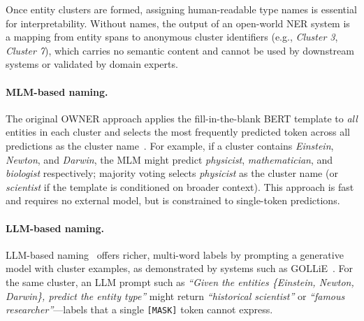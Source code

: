 \documentclass[14pt]{extreport}
\begin{document}
Once entity clusters are formed, assigning human-readable type names is essential for interpretability. Without names, the output of an open-world NER system is a mapping from entity spans to anonymous cluster identifiers (e.g., \textit{Cluster 3}, \textit{Cluster 7}), which carries no semantic content and cannot be used by downstream systems or validated by domain experts.

\paragraph{MLM-based naming.}
The original OWNER approach applies the fill-in-the-blank BERT template to \emph{all} entities in each cluster and selects the most frequently predicted token across all predictions as the cluster name~\cite{wang-etal-2023-crossner}. For example, if a cluster contains \textit{Einstein}, \textit{Newton}, and \textit{Darwin}, the MLM might predict \textit{physicist}, \textit{mathematician}, and \textit{biologist} respectively; majority voting selects \textit{physicist} as the cluster name (or \textit{scientist} if the template is conditioned on broader context). This approach is fast and requires no external model, but is constrained to single-token predictions.

\paragraph{LLM-based naming.}
LLM-based naming~\cite{brown-etal-2020-language} offers richer, multi-word labels by prompting a generative model with cluster examples, as demonstrated by systems such as GOLLiE~\cite{sainz-etal-2023-gollie}. For the same cluster, an LLM prompt such as \textit{``Given the entities \{Einstein, Newton, Darwin\}, predict the entity type''} might return \textit{``historical scientist''} or \textit{``famous researcher''}---labels that a single \texttt{[MASK]} token cannot express.
\end{document}
